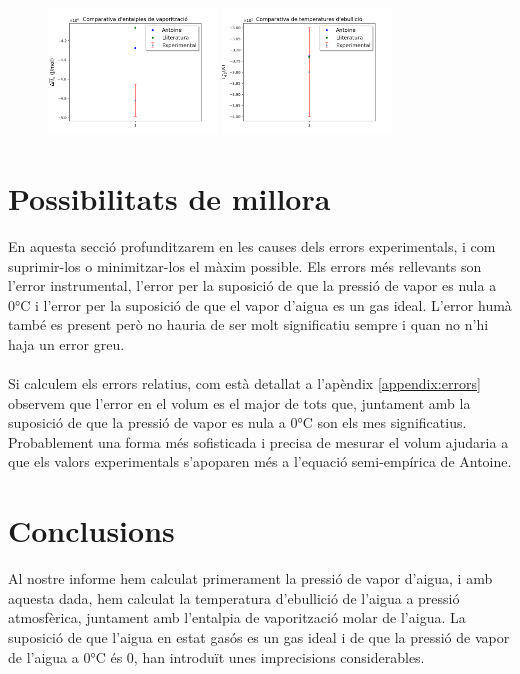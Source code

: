\documentclass{article}
\begin{document}
    \begin{figure}[h]
        \centering        \includegraphics[width=0.4\textwidth]{fotos/entalpies.png}        \includegraphics[width=0.4\textwidth]{fotos/temperatures.png}
    \end{figure}
\section{Possibilitats de millora}
    En aquesta secció profunditzarem en les causes dels errors experimentals, i com suprimir-los o minimitzar-los el màxim possible. Els errors més rellevants son l'error instrumental, l'error per la suposició de que la pressió de vapor es nula a $0\si{\celsius}$ i l'error per la suposició de que el vapor d'aigua es un gas ideal. L'error humà també es present però no hauria de ser molt significatiu sempre i quan no n'hi haja un error greu.\\ \\Si calculem els errors relatius, com està detallat a l'apèndix \ref{appendix:errors} observem que l'error en el volum es el major de tots que, juntament amb la suposició de que la pressió de vapor es nula a $0\si{\celsius}$ son els mes significatius. Probablement una forma més sofisticada i precisa de mesurar el volum ajudaria a que els valors experimentals s'apoparen més a l'equació semi-empírica de Antoine.
\section{Conclusions}
    Al nostre informe hem calculat primerament la pressió de vapor d'aigua, i amb aquesta dada, hem calculat la temperatura d'ebullició de l'aigua a pressió atmosfèrica, juntament amb l'entalpia de vaporització molar de l'aigua. La suposició de que l'aigua en estat gasós es un gas ideal i de que la pressió de vapor de l'aigua a $0\si{\celsius}$ és 0, han introduït unes imprecisions considerables.
\end{document}
